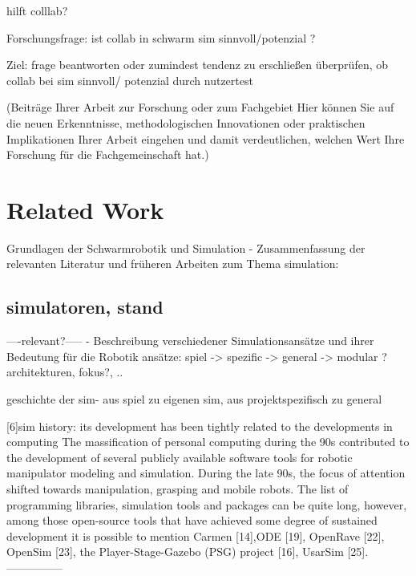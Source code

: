 \documentclass[german,version-2020-11]{uzl-thesis}
\begin{document}
hilft colllab?

      Forschungsfrage: ist collab in schwarm sim sinnvoll/potenzial ?

      Ziel: frage beantworten oder zumindest tendenz zu erschließen
        überprüfen, ob collab bei sim sinnvoll/ potenzial durch nutzertest


(Beiträge Ihrer Arbeit zur Forschung oder zum Fachgebiet 
Hier können Sie auf die neuen Erkenntnisse, methodologischen Innovationen oder praktischen Implikationen Ihrer Arbeit 
eingehen und damit verdeutlichen, welchen Wert Ihre Forschung für die Fachgemeinschaft hat.)


\section{Related Work}

%

Grundlagen der Schwarmrobotik und Simulation 
- Zusammenfassung der relevanten Literatur und früheren Arbeiten zum Thema
simulation:
\subsection{simulatoren, stand}

----relevant?-----
- Beschreibung verschiedener Simulationsansätze und ihrer Bedeutung für die Robotik
    ansätze: spiel -> spezific -> general -> modular ?
      architekturen, fokus?, ..

    geschichte der sim- aus spiel zu eigenen sim, aus projektspezifisch zu general


    [6]sim history:
      its development has been tightly related to the developments in computing
      The massification of personal computing during the 90s contributed to the development of several publicly available software tools for robotic manipulator modeling and simulation.
      During the late 90s, the focus of attention shifted towards manipulation, grasping and mobile robots. 
	    The list of programming libraries, simulation tools and packages can be quite long, however, among those open-source tools that have 
      achieved some degree of sustained development it is 	possible to mention Carmen [14],ODE [19], OpenRave [22], OpenSim [23], 
      the Player-Stage-Gazebo (PSG) project [16], UsarSim [25]. 
---------------
\end{document}
